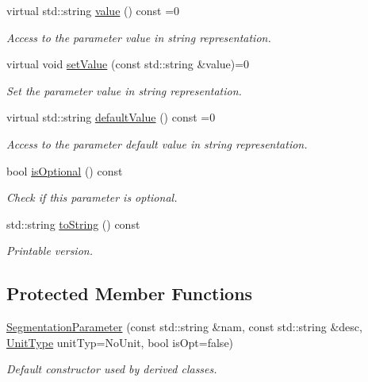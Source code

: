 \begin{DoxyCompactItemize}
virtual std::string \hyperlink{class_d_d4hep_1_1_d_d_segmentation_1_1_segmentation_parameter_a633dffe9e53306c5f67568ff5e567387}{value} () const =0
\begin{DoxyCompactList}\small\item\em Access to the parameter value in string representation. \item\end{DoxyCompactList}\item 
virtual void \hyperlink{class_d_d4hep_1_1_d_d_segmentation_1_1_segmentation_parameter_a91e9dae172660687daec4de4d730b192}{setValue} (const std::string \&value)=0
\begin{DoxyCompactList}\small\item\em Set the parameter value in string representation. \item\end{DoxyCompactList}\item 
virtual std::string \hyperlink{class_d_d4hep_1_1_d_d_segmentation_1_1_segmentation_parameter_a2ef4dee84f8c9172aca49908c8fff136}{defaultValue} () const =0
\begin{DoxyCompactList}\small\item\em Access to the parameter default value in string representation. \item\end{DoxyCompactList}\item 
bool \hyperlink{class_d_d4hep_1_1_d_d_segmentation_1_1_segmentation_parameter_ab364e7b4fd769637e72d5a47f3f0d3b6}{isOptional} () const 
\begin{DoxyCompactList}\small\item\em Check if this parameter is optional. \item\end{DoxyCompactList}\item 
std::string \hyperlink{class_d_d4hep_1_1_d_d_segmentation_1_1_segmentation_parameter_aaa7b5fba3682674663901a11fc8a22b8}{toString} () const 
\begin{DoxyCompactList}\small\item\em Printable version. \item\end{DoxyCompactList}\end{DoxyCompactItemize}
\subsection*{Protected Member Functions}
\begin{DoxyCompactItemize}
\item 
\hyperlink{class_d_d4hep_1_1_d_d_segmentation_1_1_segmentation_parameter_ae3d7cad507474b45ed2aea1629b8a919}{SegmentationParameter} (const std::string \&nam, const std::string \&desc, \hyperlink{class_d_d4hep_1_1_d_d_segmentation_1_1_segmentation_parameter_a36f5f8b8d812b2a2b81363377565d8d4}{UnitType} unitTyp=NoUnit, bool isOpt=false)
\begin{DoxyCompactList}\small\item\em Default constructor used by derived classes. \item\end{DoxyCompactList}\end{DoxyCompactItemize}
